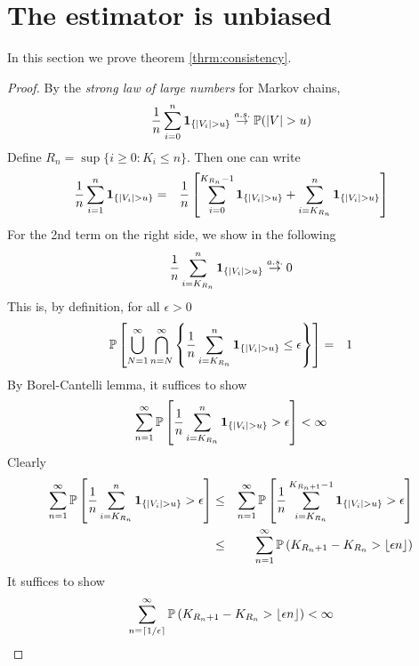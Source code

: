 \section{The estimator is unbiased}\label{sec:consistency}
In this section we prove theorem \ref{thrm:consistency}.
\begin{proof}
  By the {\em strong law of large numbers} for Markov chains,
  \begin{eqnarray*}
    {1 \over n} \sum_{i=0}^n \mathbf{1}_{\{|V_i| > u\}} \overset{a.s.}{\to} \mathbb{P}(|V| > u)
  \end{eqnarray*}
  Define $R_n =\sup\{i \geq 0: K_i \leq n\}$. Then one can write
  \begin{eqnarray}
    {1 \over n} \sum_{i=1}^n \mathbf{1}_{\{|V_i| > u\}}
    &=& 
    {1 \over n} \left[
      \sum_{i=0}^{K_{R_n}-1} \mathbf{1}_{\{|V_i| > u\}} + \sum_{i=K_{R_n}}^n \mathbf{1}_{\{|V_i| > u\}}
    \right]
    \label{eq:kioj}
  \end{eqnarray}
  For the 2nd term on the right side, we show in the following
  \begin{equation}
    \label{eq:frf}
    {1 \over n}\sum_{i=K_{R_n}}^n \mathbf{1}_{\{|V_i| > u\}} \overset{a.s.}{\to} 0
  \end{equation}
  This is, by definition, for all $\epsilon > 0$
  \begin{eqnarray*}
    \mathbb{P} \left[
      \bigcup_{N=1}^\infty \bigcap_{n=N}^\infty
      \left\{
        {1 \over n} \sum_{i=K_{R_n}}^{n} \mathbf{1}_{\{|V_i| > u\}} \leq \epsilon
      \right\}
    \right] &=& 1
  \end{eqnarray*}
  By Borel-Cantelli lemma, it suffices to show
  \[
  \sum_{n=1}^\infty \mathbb{P}\left[
    {1 \over n} \sum_{i=K_{R_n}}^{n} \mathbf{1}_{\{|V_i| > u\}} > \epsilon
  \right] < \infty
  \]
  Clearly
  \begin{eqnarray*}
    \sum_{n=1}^\infty \mathbb{P}\left[
      {1 \over n} \sum_{i=K_{R_n}}^{n} \mathbf{1}_{\{|V_i| > u\}} > \epsilon
    \right]
    &\leq&
    \sum_{n=1}^\infty \mathbb{P}\left[
      {1 \over n} \sum_{i=K_{R_n}}^{K_{R_n + 1} - 1} \mathbf{1}_{\{|V_i| > u\}} > \epsilon
    \right] \\
    &\leq&
    \sum_{n=1}^\infty \mathbb{P}\left(
      {K_{R_n + 1} - K_{R_n}} > \lfloor \epsilon n\rfloor
    \right)
  \end{eqnarray*}
  It suffices to show
  \[
  \sum_{n=\lceil 1/\epsilon\rceil}^\infty \mathbb{P}\left(
    {K_{R_n + 1} - K_{R_n}} > \lfloor \epsilon n\rfloor
  \right) < \infty
\]
\end{proof}
